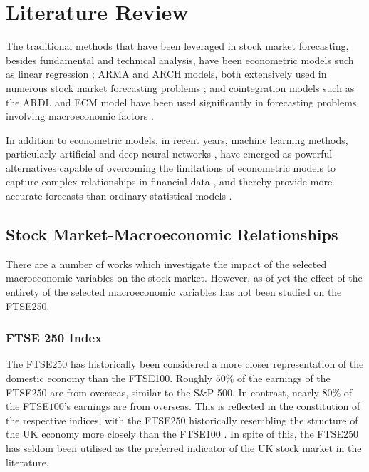 \documentclass[11pt,a4paper]{article}
\begin{document}
\section{Literature Review}

The traditional methods that have been leveraged in stock market forecasting, 
besides fundamental and technical analysis, have been econometric models such as 
linear regression \citep{shakhla2018stock,roy2015stock}; ARMA and ARCH models, both extensively used in numerous stock market forecasting problems \citep{herwartz2017stock,hu2020stock,oberholzer2015garch,rounaghi}; and cointegration models such as the 
ARDL and ECM model have been used significantly in forecasting problems involving macroeconomic factors \citep{demir2019,khan2018,neifar2023}. 

In addition to econometric models, in recent years, machine learning methods, 
particularly artificial and deep neural networks \citep{chen2015lstm,kara2011ann,long2019deep,nelson2017lstm}, have emerged as powerful alternatives capable of overcoming the limitations of econometric models to capture complex relationships in financial data \citep{rossi2018ml}, and thereby provide more accurate forecasts than ordinary statistical models \citep{lapitskaya2021armax}. 

\subsection{Stock Market-Macroeconomic Relationships}

There are a number of works which investigate the impact of 
the selected macroeconomic variables
on the stock market. However, as of yet the effect of the entirety of the selected 
macroeconomic variables has not been studied on the FTSE250. 

\subsubsection{FTSE 250 Index}

The FTSE250 has historically been considered a more closer representation of the domestic economy than the FTSE100. Roughly $50\%$ of the earnings of the FTSE250 are from overseas, similar to the S\&P 500. In contrast, nearly $80\%$ of the FTSE$100$'s earnings are from overseas. 
This is reflected in the constitution of the respective indices, with the 
FTSE250 historically resembling the structure of the UK economy more closely than the FTSE100 \citep{ftse250history}.
In spite of this, the FTSE250 has seldom been utilised as the preferred indicator of the UK stock market in the literature.
\end{document}
